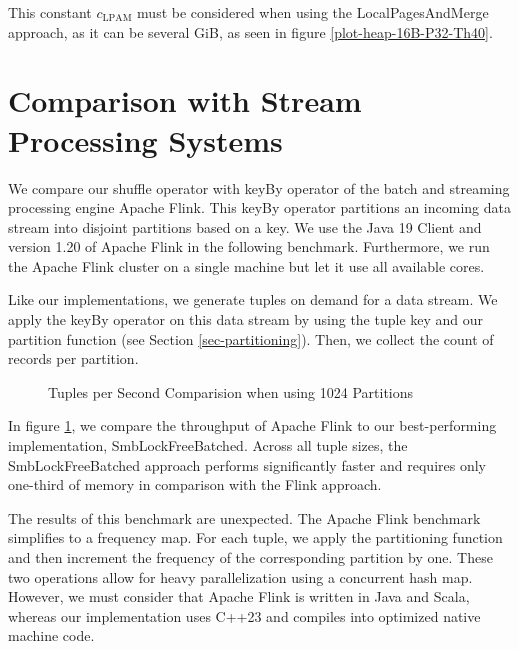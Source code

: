 This constant $c_\textrm{LPAM}$ must be considered when using the Local\-Pages\-And\-Merge approach, as it can be several GiB, as seen in figure \ref{plot-heap-16B-P32-Th40}.
\section{Comparison with Stream Processing Systems}
We compare our shuffle operator with keyBy operator of the batch and streaming processing engine Apache Flink\cite{apache-flink}.
This keyBy operator partitions an incoming data stream into disjoint partitions based on a key.
We use the Java 19 Client and version 1.20 of Apache Flink in the following benchmark.
Furthermore, we run the Apache Flink cluster on a single machine but let it use all available cores.

Like our implementations, we generate tuples on demand for a data stream.
We apply the keyBy operator on this data stream by using the tuple key and our partition function (see Section \ref{sec-partitioning}).
Then, we collect the count of records per partition.
\begin{figure}[h]
  \centering
  \resizebox{.75\linewidth}{!}{}
  \caption{Tuples per Second Comparision when using 1024 Partitions}
  \label{plot-apache-flink-comparison}
\end{figure}

In figure \ref{plot-apache-flink-comparison}, we compare the throughput of Apache Flink to our best-performing implementation, Smb\-Lock\-Free\-Batched.
Across all tuple sizes, the Smb\-Lock\-Free\-Batched approach performs significantly faster and requires only one-third of memory in comparison with the Flink approach.

The results of this benchmark are unexpected.
The Apache Flink benchmark simplifies to a frequency map.
For each tuple, we apply the partitioning function and then increment the frequency of the corresponding partition by one.
These two operations allow for heavy parallelization using a concurrent hash map.
However, we must consider that Apache Flink is written in Java and Scala, whereas our implementation uses C++23 and compiles into optimized native machine code.
